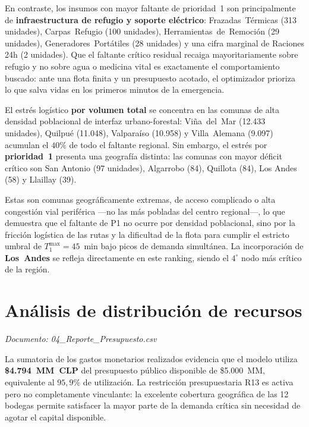 \documentclass[letterpaper]{article}
\begin{document}
En contraste, los insumos con mayor faltante de prioridad~1 son principalmente de
\textbf{infraestructura de refugio y soporte eléctrico}: Frazadas~Térmicas (313 unidades),
Carpas~Refugio (100 unidades), Herramientas~de~Remoción (29 unidades), Generadores~Portátiles (28 unidades) y una cifra marginal de Raciones 24h (2 unidades).
Que el faltante crítico residual recaiga mayoritariamente sobre refugio y no sobre agua o medicina vital es exactamente el comportamiento buscado: ante una flota finita y un presupuesto acotado, el optimizador prioriza lo que salva vidas en los primeros minutos de la emergencia.

El estrés logístico \textbf{por volumen total} se concentra en las comunas de
alta densidad poblacional de interfaz urbano-forestal: Viña~del~Mar (12.433
unidades), Quilpué (11.048), Valparaíso (10.958) y Villa~Alemana (9.097)
acumulan el $40\%$ de todo el faltante regional. Sin embargo, el estrés por
\textbf{prioridad~1} presenta una geografía distinta: las comunas con mayor
déficit crítico son San Antonio (97 unidades), Algarrobo (84), Quillota (84), Los Andes (58) y Llaillay (39).

Estas son comunas geográficamente extremas, de acceso complicado o alta congestión vial periférica —no las más pobladas del centro regional—, lo que demuestra que el faltante de P1 no ocurre por densidad poblacional, sino por la fricción logística de las rutas y la dificultad de la flota para cumplir el estricto umbral de $T^{\max}_1 = 45$~min bajo picos de demanda simultánea. La incorporación de \textbf{Los~Andes} se refleja
directamente en este ranking, siendo el $4^{\circ}$ nodo más crítico de la región.

\section{Análisis de distribución de recursos}

\textit{Documento: 04\_Reporte\_Presupuesto.csv}

La sumatoria de los gastos monetarios realizados evidencia que el modelo
utiliza \textbf{\$4.794~MM~CLP} del presupuesto público disponible de
\$5.000~MM, equivalente al $95{,}9\%$ de utilización. La restricción
presupuestaria R13 es activa pero no completamente vinculante: la excelente
cobertura geográfica de las 12 bodegas permite satisfacer la mayor parte de
la demanda crítica sin necesidad de agotar el capital disponible.
\end{document}
